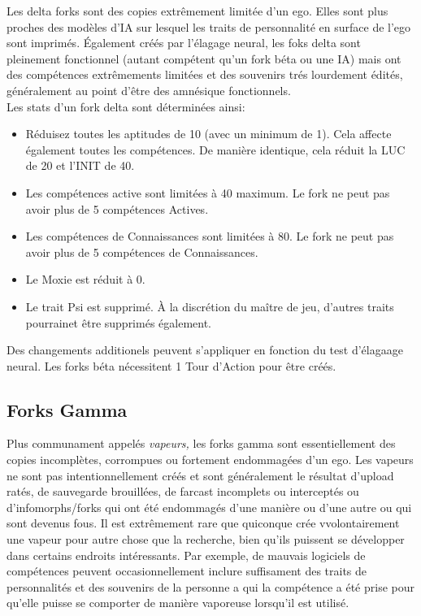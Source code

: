 Les delta forks sont des copies extrêmement limitée d'un ego. Elles sont plus proches des modèles d'IA sur lesquel les traits de personnalité en surface de l'ego sont imprimés. Également créés par l'élagage neural, les foks delta sont pleinement fonctionnel (autant compétent qu'un fork béta ou une IA) mais ont des compétences extrêmements limitées et des souvenirs trés lourdement édités, généralement au point d'être des amnésique fonctionnels. \\ Les stats d'un fork delta sont déterminées ainsi: 

\begin{itemize} \item Réduisez toutes les aptitudes de 10 (avec un minimum de 1). Cela affecte également toutes les compétences. De manière identique, cela réduit la LUC de 20 et l'INIT de 40. \item Les compétences active sont limitées à 40 maximum. Le fork ne peut pas avoir plus de 5 compétences Actives. 

\item Les compétences de Connaissances sont limitées à 80. Le fork ne peut pas avoir plus de 5 compétences de Connaissances. \item Le Moxie est réduit à 0. \item Le trait Psi est supprimé. À la discrétion du maître de jeu, d'autres traits pourrainet être supprimés également. \end{itemize} 

Des changements additionels peuvent s'appliquer en fonction du test d'élagaage neural. Les forks béta nécessitent 1 Tour d'Action pour être créés. 

\subsection{Forks Gamma} 

Plus communament appelés \textit{vapeurs,} les forks gamma sont essentiellement des copies incomplètes, corrompues ou fortement endommagées d'un ego. Les vapeurs ne sont pas intentionnellement créés et sont généralement le résultat d'upload ratés, de sauvegarde brouillées, de farcast incomplets ou interceptés ou d'infomorphs/forks qui ont été endommagés d'une manière ou d'une autre ou qui sont devenus fous. Il est extrêmement rare que quiconque crée vvolontairement une vapeur pour autre chose que la recherche, bien qu'ils puissent se développer dans certains endroits intéressants. Par exemple, de mauvais logiciels de compétences peuvent occasionnellement inclure suffisament des traits de personnalités et des souvenirs de la personne a qui la compétence a été prise pour qu'elle puisse se comporter de manière vaporeuse lorsqu'il est utilisé. 

